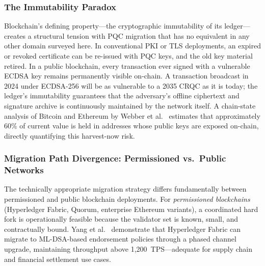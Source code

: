 \documentclass[journal]{IEEEtran}
\begin{document}
\subsubsection{The Immutability Paradox}

Blockchain's defining property---the cryptographic immutability of its
ledger---creates a structural tension with PQC migration that has no
equivalent in any other domain surveyed here. In conventional PKI or TLS
deployments, an expired or revoked certificate can be re-issued with PQC
keys, and the old key material retired. In a public blockchain, every
transaction ever signed with a vulnerable ECDSA key remains permanently
visible on-chain. A transaction broadcast in 2024 under ECDSA-256 will be
as vulnerable to a 2035 CRQC as it is today; the ledger's immutability
guarantees that the adversary's offline ciphertext and signature archive
is continuously maintained by the network itself. A chain-state analysis
of Bitcoin and Ethereum by Webber et al.~\cite{webber2022impact} estimates
that approximately 60\% of current value is held in addresses whose public
keys are exposed on-chain, directly quantifying this harvest-now risk.

\subsubsection{Migration Path Divergence: Permissioned vs.\ Public Networks}

The technically appropriate migration strategy differs fundamentally
between permissioned and public blockchain deployments. For
\emph{permissioned blockchains} (Hyperledger Fabric, Quorum, enterprise
Ethereum variants), a coordinated hard fork is operationally feasible
because the validator set is known, small, and contractually bound.
Yang et al.~\cite{yang2024survey} demonstrate that Hyperledger Fabric can
migrate to ML-DSA-based endorsement policies through a phased channel
upgrade, maintaining throughput above 1,200~TPS---adequate for supply
chain and financial settlement use cases.
\end{document}
